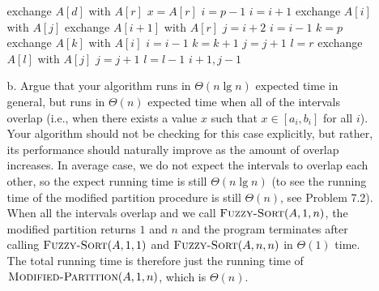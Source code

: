 \documentclass[12pt,reqno]{amsart}
\newif\ifanswer
\begin{document}
\begin{enumerate}[1.]
\begin{enumerate}
{\begin{algorithm}
\begin{algorithmic}[1]
            \STATE exchange $A[d]$ with $A[r]$
            \STATE $x = A[r]$
            \STATE $i = p - 1$
                    \STATE $i = i + 1$
                    \STATE exchange $A[i]$ with $A[j]$
                \ENDIF
            \ENDFOR
            \STATE exchange $A[i + 1]$ with $A[r]$
            \STATE $j = i + 2$
                \STATE $i = i - 1$
            \ENDWHILE
            \STATE $k = p$
                    \STATE exchange $A[k]$ with $A[i]$
                        \STATE $i = i - 1$
                    \ENDWHILE
                \ENDIF
                \STATE $k = k + 1$
            \ENDWHILE
                \STATE $j = j + 1$
            \ENDWHILE
            \STATE $l = r$
                    \STATE exchange $A[l]$ with $A[j]$
                        \STATE $j = j + 1$
                    \ENDWHILE
                \ENDIF
                \STATE $l = l - 1$
            \ENDWHILE
            \RETURN $i + 1, j - 1$
        \end{algorithmic}
    \end{algorithm}
    }
    \newpage
    \item[b.] Argue that your algorithm runs in $\Theta(n\lg{n})$ expected time in general, but runs in $\Theta(n)$ expected time when all of the intervals overlap (i.e., when there exists a value $x$ such that $x\in[a_i, b_i]$ for all $i$). Your algorithm should not be checking for this case explicitly, but rather, its performance should naturally improve as the amount of overlap increases.
    \ifanswer
    \noindent {\bf \\Solution}
    In average case, we do not expect the intervals to overlap each other, so the expect running time is still $\Theta(n\lg{n})$ (to see the running time of the modified partition procedure is still $\Theta(n)$, see Problem 7.2).\\
    When all the intervals overlap and we call $\textsc{Fuzzy-Sort}(A, 1, n)$, the modified partition returns $1$ and $n$ and the program terminates after calling $\textsc{Fuzzy-Sort}(A, 1, 1)$ and $\textsc{Fuzzy-Sort}(A, n, n)$ in $\Theta(1)$ time. The total running time is therefore just the running time of $\textsc{Modified-Partition}(A, 1, n)$, which is $\Theta(n)$.
\end{enumerate}



\end{enumerate}
\end{document}
